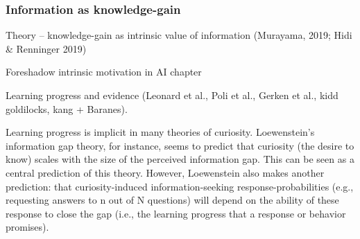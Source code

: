     \subsubsection{Information as knowledge-gain}

        Theory -- knowledge-gain as intrinsic value of information (Murayama, 2019; Hidi & Renninger 2019)

            Foreshadow intrinsic motivation in AI chapter

            Learning progress and evidence (Leonard et al., Poli et al., Gerken et al., kidd goldilocks, kang + Baranes).

            Learning progress is implicit in many theories of curiosity. Loewenstein's information gap theory, for instance, seems to predict that curiosity (the desire to know) scales with the size of the perceived information gap. This can be seen as a central prediction of this theory. However, Loewenstein also makes another prediction: that curiosity-induced information-seeking response-probabilities (e.g., requesting answers to n out of N questions) will depend on the ability of these response to close the gap (i.e., the learning progress that a response or behavior promises).

